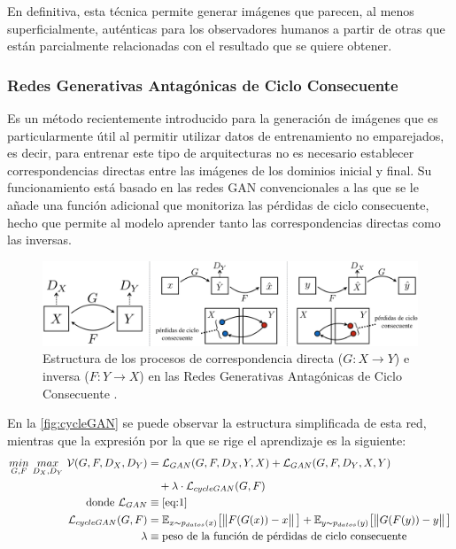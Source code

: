En definitiva, esta técnica permite generar imágenes que parecen, al menos superficialmente, auténticas para los observadores humanos a partir de otras que están parcialmente relacionadas con el resultado que se quiere obtener.

\subsubsection{Redes Generativas Antagónicas de Ciclo Consecuente \cite{cycleGAN}}

Es un método recientemente introducido para la generación de imágenes que es particularmente útil al permitir utilizar datos de entrenamiento no emparejados, es decir, para entrenar este tipo de arquitecturas no es necesario establecer correspondencias directas entre las imágenes de los dominios inicial y final. Su funcionamiento está basado en las redes GAN convencionales a las que se le añade una función adicional que monitoriza las pérdidas de ciclo consecuente, hecho que permite al modelo aprender tanto las correspondencias directas como las inversas.
\begin{figure}
    \centering
    \includegraphics[width=\textwidth]{Images/cycleGAN.png}
    \caption{Estructura de los procesos de correspondencia directa ($G : X \to Y$) e inversa ($F : Y \to X$) en las Redes Generativas Antagónicas de Ciclo Consecuente \cite{cycleGAN}.}
    \label{fig:cycleGAN}
\end{figure}

En la \autoref{fig:cycleGAN} se puede observar la estructura simplificada de esta red, mientras que la expresión por la que se rige el aprendizaje es la siguiente:
\begin{align*}
    \underset{G,F}{min} \ \underset{D_X, D_Y}{max} \ \mathcal{V}(G, F, D_X, D_Y) &= \mathcal{L}_{GAN}(G, F, D_X, Y, X) + \mathcal{L}_{GAN}(G, F, D_Y, X, Y) \\ &\quad + \lambda \cdot \mathcal{L}_{cycleGAN}(G, F) \\
    \text{donde}~
    \mathcal{L}_{GAN} &\equiv \text{\autoref{eq:1}} \\
    \mathcal{L}_{cycleGAN}(G, F) &= \mathbb{E}_{x\sim p_{datos}(x)} \big[\norm{F(G(x)) - x}\big] + \mathbb{E}_{y\sim p_{datos}(y)} \big[\norm{G(F(y)) - y}\big] \\
    \lambda &\equiv \text{peso de la función de pérdidas de ciclo consecuente}
\end{align*}


